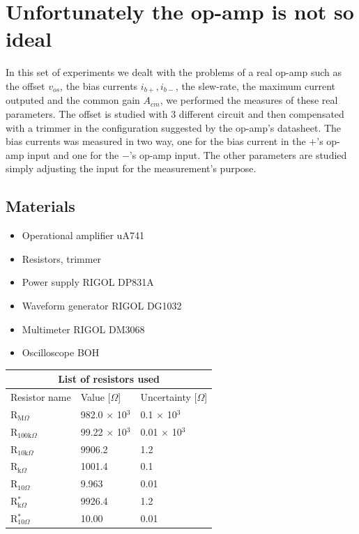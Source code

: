 \documentclass[oneside]{book}
\begin{document}
\chapter{Unfortunately the op-amp is not so ideal}
In this set of experiments we dealt with the problems of a real op-amp such as the offset $v_{os}$, the bias currents $i_{b+},i_{b-}$, the slew-rate, the maximum current outputed and the common gain $A_{cm}$, we performed the measures of these real parameters. The offset is studied with 3 different circuit and then compensated with a trimmer in the configuration suggested by the op-amp's datasheet. The bias currents was measured in two way, one for the bias current in the $+$'s op-amp input and one for the $-$'s op-amp input. The other parameters are studied simply adjusting the input for the measurement's purpose.

\section{Materials}
\begin{itemize}
\item Operational amplifier uA741
\item Resistors, trimmer
\item Power supply RIGOL DP831A
\item Waveform generator RIGOL DG1032
\item Multimeter RIGOL DM3068
\item Oscilloscope BOH
\end{itemize}

\begin{tabular}{ |p{3cm}||p{3cm}|p{3cm}| }
 \hline
 \multicolumn{3}{|c|}{List of resistors used} \\
 \hline
 Resistor name & Value [$\Omega$] & Uncertainty [$\Omega$]\\
 \hline
 R$_{\text{M}\Omega}$   & 982.0 $\times$ 10$^3$ & 0.1 $\times$ 10$^3$  \\
 R$_{100\text{k}\Omega}$& 99.22 $\times$ 10$^3$ & 0.01 $\times$ 10$^3$ \\
 R$_{10\text{k}\Omega}$ &   9906.2            & 1.2         \\
 R$_{\text{k}\Omega}$   &  1001.4             & 0.1         \\
 R$_{10\Omega}$         &  9.963              & 0.01        \\
 R$_{\text{k}\Omega}^*$ &  9926.4             & 1.2         \\
 R$_{10\Omega}^*$       &10.00                & 0.01        \\
 
 \hline
\end{tabular}
\end{document}
